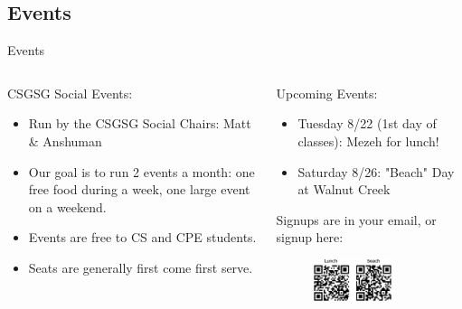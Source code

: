 \documentclass[aspectratio=169]{beamer}
\begin{document}
\subsection{Events}
\begin{frame}{Events}
\begin{columns}
\begin{column}{0.5\textwidth}
CSGSG Social Events:
\begin{itemize}
    \item Run by the CSGSG Social Chairs: Matt \& Anshuman
    \item Our goal is to run 2 events a month: one free food during a week, one large event on a weekend.
    \item Events are free to CS and CPE students. 
    \item Seats are generally first come first serve. 
\end{itemize}
\end{column}

\begin{column}{0.5\textwidth}
Upcoming Events:
\begin{itemize}
    \item Tuesday 8/22 (1st day of classes): Mezeh for lunch!
    \item Saturday 8/26: "Beach" Day at Walnut Creek
\end{itemize}
Signups are in your email, or signup here:

 \begin{figure}
     \centering
     \includegraphics[width=0.7\textwidth]{QRs.pdf}
 \end{figure}
\end{column}
\end{columns}
\end{frame}
\end{document}
